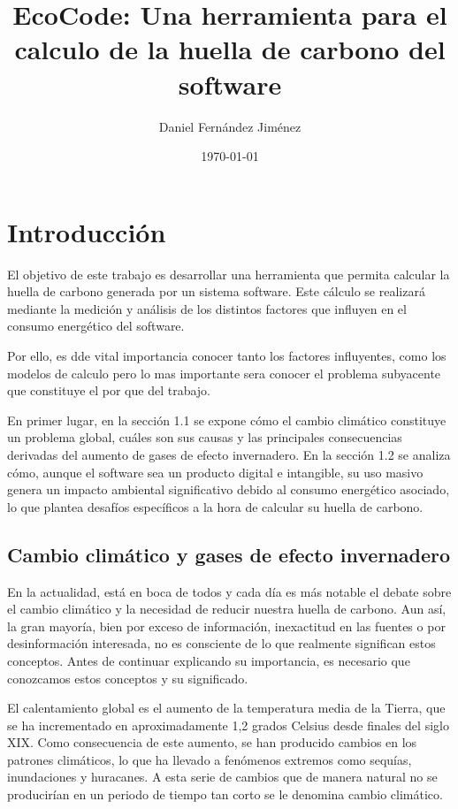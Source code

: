 \documentclass[12pt,a4paper]{report}
\title{EcoCode: Una herramienta para el calculo de la huella de carbono del software}
\author{Daniel Fernández Jiménez}
\date{\today}
\begin{document}
\maketitle

\tableofcontents
\newpage

\chapter{Introducción}

El objetivo de este trabajo es desarrollar una herramienta que permita calcular
la huella de carbono generada por un sistema software. Este cálculo se
realizará mediante la medición y análisis de los distintos factores que
influyen en el consumo energético del software.

Por ello, es dde vital importancia conocer tanto los factores influyentes, como
los modelos de calculo pero lo mas importante sera conocer el problema subyacente 
que constituye el por que del trabajo.

En primer lugar, en la sección 1.1 se expone cómo el cambio climático constituye 
un problema global, cuáles son sus causas y las principales consecuencias derivadas 
del aumento de gases de efecto invernadero. En la sección 1.2 se analiza cómo, 
aunque el software sea un producto digital e intangible, su uso masivo genera un 
impacto ambiental significativo debido al consumo energético asociado, lo que 
plantea desafíos específicos a la hora de calcular su huella de carbono.

\section{Cambio climático y gases de efecto invernadero}

En la actualidad, está en boca de todos y cada día es más notable el debate
sobre el cambio climático y la necesidad de reducir nuestra huella de carbono.
Aun así, la gran mayoría, bien por exceso de información, inexactitud en las
fuentes o por desinformación interesada, no es consciente de lo que realmente
significan estos conceptos. Antes de continuar explicando su importancia, es
necesario que conozcamos estos conceptos y su significado.

El calentamiento global es el aumento de la temperatura media de la Tierra, que
se ha incrementado en aproximadamente 1,2 grados Celsius desde finales del
siglo XIX. Como consecuencia de este aumento, se han producido cambios en los
patrones climáticos, lo que ha llevado a fenómenos extremos como sequías,
inundaciones y huracanes. A esta serie de cambios que de manera natural no se
producirían en un periodo de tiempo tan corto se le denomina cambio climático.
\end{document}

